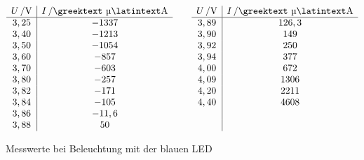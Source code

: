 \documentclass[numbers=noenddot,12pt,a4paper]{scrartcl}
\newcommand{\greek}[1]{\greektext#1\latintext}
\begin{document}
\begin{table}[H]
\begin{align*}
\begin{array}{c|c}
	\unit[U]{/V} & \unit[I]{/\text{\greek{µ}}A}\\\hline
	3,25 & -1337 \\
	3,40 & -1213 \\
	3,50 & -1054 \\
	3,60 & -857 \\
	3,70 & -603 \\
	3,80 & -257 \\
	3,82 & -171 \\
	3,84 & -105 \\
	3,86 & -11,6 \\
	3,88 & 50 \\
	\end{array}
	\hspace{2em}
	\begin{array}{c|c}
	\unit[U]{/V} & \unit[I]{/\text{\greek{µ}}A}\\\hline
	3,89 & 126,3 \\
	3,90 & 149 \\
	3,92 & 250 \\
	3,94 & 377 \\
	4,00 & 672 \\
	4,09 & 1306 \\
	4,20 & 2211 \\
	4,40 & 4608 \\
	\, & \, \\
	\, & \, \\
	\end{array}  
\end{align*}
\vspace{-1em}
\caption{Messwerte bei Beleuchtung mit der blauen LED}
\label{tab:blau}
\end{table}
\end{document}
